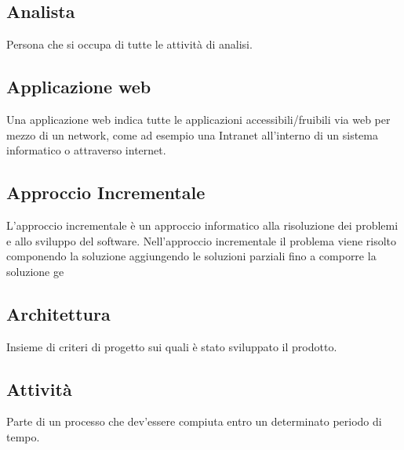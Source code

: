 \documentclass[../glossario.tex]{subfiles}
\begin{document}
\subsection*{Analista}
Persona che si occupa di tutte le attività di analisi.

\subsection*{Applicazione web}
Una applicazione web indica tutte le applicazioni accessibili/fruibili via web per mezzo di un network, come ad esempio una Intranet all'interno di un sistema informatico o attraverso internet. 

\subsection*{Approccio Incrementale}
L'approccio incrementale è un approccio informatico alla risoluzione dei problemi e allo sviluppo del software. Nell'approccio incrementale il problema viene risolto componendo la soluzione aggiungendo le soluzioni parziali fino a comporre la soluzione ge

\subsection*{Architettura}
Insieme di criteri di progetto sui quali è stato sviluppato il prodotto.

\subsection*{Attività}
Parte di un processo che dev'essere compiuta entro un determinato periodo di tempo.
\end{document}
